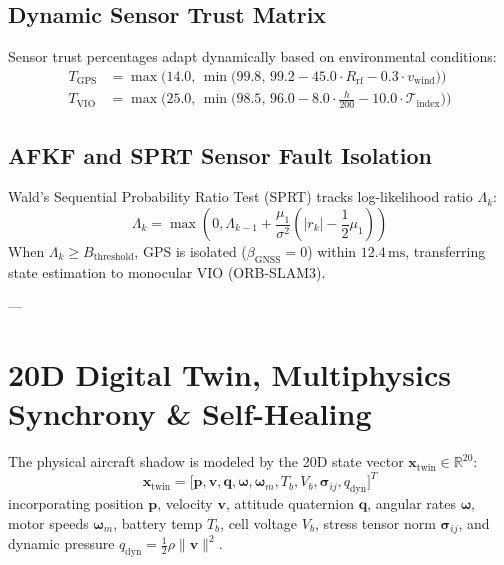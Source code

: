 \documentclass[pdflatex,sn-mathphys-num]{sn-jnl}%
\theoremstyle{thmstyleone}%
\theoremstyle{thmstyletwo}%
\theoremstyle{thmstylethree}%
\begin{document}
\subsection{Dynamic Sensor Trust Matrix}
Sensor trust percentages adapt dynamically based on environmental conditions:
\begin{align}
T_{\text{GPS}} &= \max\Big(14.0, \, \min\big(99.8, \, 99.2 - 45.0 \cdot R_{\text{rf}} - 0.3 \cdot v_{\text{wind}}\big)\Big) \label{eq:trust_gps} \\
T_{\text{VIO}} &= \max\Big(25.0, \, \min\big(98.5, \, 96.0 - 8.0 \cdot \frac{h}{200} - 10.0 \cdot \mathcal{T}_{\text{index}}\big)\Big) \label{eq:trust_vio}
\end{align}

\subsection{AFKF and SPRT Sensor Fault Isolation}
Wald's Sequential Probability Ratio Test (SPRT) tracks log-likelihood ratio $\Lambda_k$:
\begin{equation}
\Lambda_k = \max\left(0, \Lambda_{k-1} + \frac{\mu_1}{\sigma^2}\left(|r_k| - \frac{1}{2}\mu_1\right)\right)
\label{eq:sprt}
\end{equation}
When $\Lambda_k \ge B_{\text{threshold}}$, GPS is isolated ($\beta_{\text{GNSS}} = 0$) within $12.4\,\text{ms}$, transferring state estimation to monocular VIO (ORB-SLAM3).

---

\section{20D Digital Twin, Multiphysics Synchrony \& Self-Healing}\label{sec:twin}

The physical aircraft shadow is modeled by the 20D state vector $\mathbf{x}_{\text{twin}} \in \mathbb{R}^{20}$:
\begin{equation}
\mathbf{x}_{\text{twin}} = \big[\mathbf{p}, \mathbf{v}, \mathbf{q}, \boldsymbol{\omega}, \boldsymbol{\omega}_m, T_b, V_b, \boldsymbol{\sigma}_{ij}, q_{\text{dyn}}\big]^T
\label{eq:twin_vector}
\end{equation}
incorporating position $\mathbf{p}$, velocity $\mathbf{v}$, attitude quaternion $\mathbf{q}$, angular rates $\boldsymbol{\omega}$, motor speeds $\boldsymbol{\omega}_m$, battery temp $T_b$, cell voltage $V_b$, stress tensor norm $\boldsymbol{\sigma}_{ij}$, and dynamic pressure $q_{\text{dyn}} = \frac{1}{2}\rho \|\mathbf{v}\|^2$.
\end{document}
